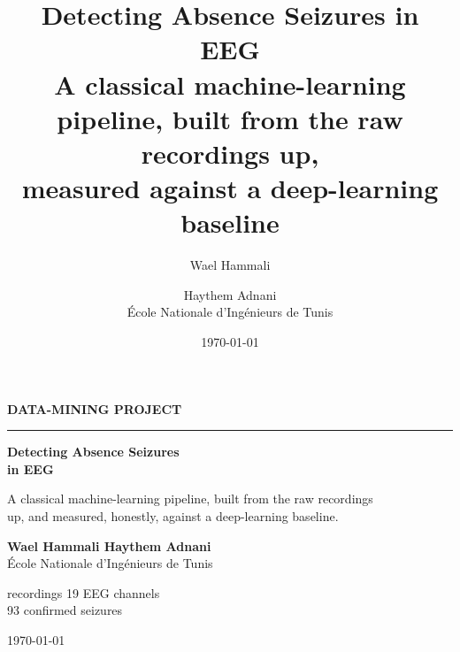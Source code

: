 \documentclass[11pt,a4paper]{report}
\title{\Huge\textbf{Detecting Absence Seizures in EEG}\\[6pt]
  \Large A classical machine-learning pipeline, built from the raw recordings up,\\
  measured against a deep-learning baseline}
\author{Wael Hammali \and Haythem Adnani\\\small École Nationale d'Ingénieurs de Tunis}
\date{\today}
\begin{document}
\begin{titlepage}
  \centering
  \vspace*{2cm}
  {\small\bfseries\color{seizureteal} DATA-MINING PROJECT\par}
  \vspace{0.3cm}
  \rule{0.4\linewidth}{0.8pt}\par
  \vspace{1.5cm}
  {\Huge\bfseries\color{inkdark} Detecting Absence Seizures\\[4pt] in EEG\par}
  \vspace{1cm}
  {\Large A classical machine-learning pipeline, built from the raw recordings\\
   up, and measured, honestly, against a deep-learning baseline.\par}
  \vfill
  \begin{minipage}{0.45\linewidth}
    \raggedright
    \textbf{Wael Hammali \textbullet{} Haythem Adnani}\\
    École Nationale d'Ingénieurs de Tunis
  \end{minipage}
  \hfill
  \begin{minipage}{0.45\linewidth}
     recordings \textbullet{} 19 EEG channels\\
    93 confirmed seizures
  \end{minipage}
  \vspace{1.5cm}
  \par{\large \today\par}
\end{titlepage}

\tableofcontents
\listoffigures
\listoftables
\clearpage
{}












\appendix

\end{document}
